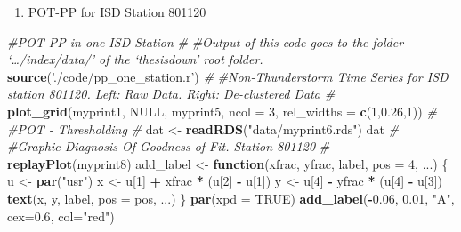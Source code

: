 \documentclass[12pt,oneside]{reedthesis}
\newenvironment{Shaded}{\begin{snugshade}}{\end{snugshade}}
\newcommand{\CommentTok}[1]{\textcolor[rgb]{0.56,0.35,0.01}{\textit{#1}}}
\newcommand{\ControlFlowTok}[1]{\textcolor[rgb]{0.13,0.29,0.53}{\textbf{#1}}}
\newcommand{\DataTypeTok}[1]{\textcolor[rgb]{0.13,0.29,0.53}{#1}}
\newcommand{\DecValTok}[1]{\textcolor[rgb]{0.00,0.00,0.81}{#1}}
\newcommand{\FloatTok}[1]{\textcolor[rgb]{0.00,0.00,0.81}{#1}}
\newcommand{\KeywordTok}[1]{\textcolor[rgb]{0.13,0.29,0.53}{\textbf{#1}}}
\newcommand{\NormalTok}[1]{#1}
\newcommand{\OperatorTok}[1]{\textcolor[rgb]{0.81,0.36,0.00}{\textbf{#1}}}
\newcommand{\OtherTok}[1]{\textcolor[rgb]{0.56,0.35,0.01}{#1}}
\newcommand{\StringTok}[1]{\textcolor[rgb]{0.31,0.60,0.02}{#1}}
\providecommand{\tightlist}{%
  \setlength{\itemsep}{0pt}\setlength{\parskip}{0pt}}
\begin{document}
\normalsize
\begin{enumerate}
\def\labelenumi{\arabic{enumi}.}
\setcounter{enumi}{2}
\tightlist
\item
  POT-PP for ISD Station 801120
\end{enumerate}
\tiny

\vspace{0.4cm}
\begin{Shaded}
\begin{Highlighting}[]
\CommentTok{#POT-PP in one ISD Station}
\CommentTok{#}
\CommentTok{#Output of this code goes to the folder ‘…/index/data/’ of the ‘thesisdown’ root folder.}
\KeywordTok{source}\NormalTok{(}\StringTok{'./code/pp_one_station.r'}\NormalTok{)}
\CommentTok{#}
\CommentTok{#Non-Thunderstorm Time Series for ISD station 801120. Left: Raw Data. Right: De-clustered Data}
\CommentTok{#}
\KeywordTok{plot_grid}\NormalTok{(myprint1, }\OtherTok{NULL}\NormalTok{, myprint5, }\DataTypeTok{ncol =} \DecValTok{3}\NormalTok{,  }\DataTypeTok{rel_widths =} \KeywordTok{c}\NormalTok{(}\DecValTok{1}\NormalTok{,}\FloatTok{0.26}\NormalTok{,}\DecValTok{1}\NormalTok{))}
\CommentTok{#}
\CommentTok{#POT - Thresholding}
\CommentTok{#}
\NormalTok{dat <-}\StringTok{ }\KeywordTok{readRDS}\NormalTok{(}\StringTok{"data/myprint6.rds"}\NormalTok{)}
\NormalTok{dat}
\CommentTok{#}
\CommentTok{#Graphic Diagnosis Of Goodness of Fit. Station 801120}
\CommentTok{#}
\KeywordTok{replayPlot}\NormalTok{(myprint8)}
\NormalTok{add_label <-}\StringTok{ }\ControlFlowTok{function}\NormalTok{(xfrac, yfrac, label, }\DataTypeTok{pos =} \DecValTok{4}\NormalTok{, ...) \{}
\NormalTok{  u <-}\StringTok{ }\KeywordTok{par}\NormalTok{(}\StringTok{"usr"}\NormalTok{)}
\NormalTok{  x <-}\StringTok{ }\NormalTok{u[}\DecValTok{1}\NormalTok{] }\OperatorTok{+}\StringTok{ }\NormalTok{xfrac }\OperatorTok{*}\StringTok{ }\NormalTok{(u[}\DecValTok{2}\NormalTok{] }\OperatorTok{-}\StringTok{ }\NormalTok{u[}\DecValTok{1}\NormalTok{])}
\NormalTok{  y <-}\StringTok{ }\NormalTok{u[}\DecValTok{4}\NormalTok{] }\OperatorTok{-}\StringTok{ }\NormalTok{yfrac }\OperatorTok{*}\StringTok{ }\NormalTok{(u[}\DecValTok{4}\NormalTok{] }\OperatorTok{-}\StringTok{ }\NormalTok{u[}\DecValTok{3}\NormalTok{])}
  \KeywordTok{text}\NormalTok{(x, y, label, }\DataTypeTok{pos =}\NormalTok{ pos, ...)}
\NormalTok{\}}
\KeywordTok{par}\NormalTok{(}\DataTypeTok{xpd =} \OtherTok{TRUE}\NormalTok{)}
\KeywordTok{add_label}\NormalTok{(}\OperatorTok{-}\FloatTok{0.06}\NormalTok{, }\FloatTok{0.01}\NormalTok{, }\StringTok{"A"}\NormalTok{, }\DataTypeTok{cex=}\FloatTok{0.6}\NormalTok{, }\DataTypeTok{col=}\StringTok{"red"}\NormalTok{)}

\end{Highlighting}
\end{Shaded}
\end{document}
